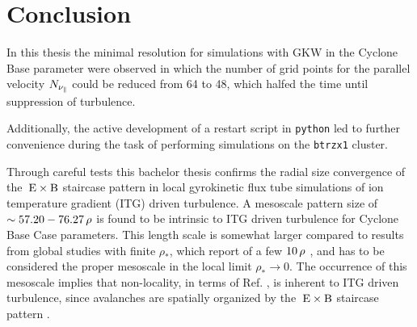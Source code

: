 
\chapter{Conclusion}
\label{chap:close}

\thispagestyle{empty}
\newpage

In this thesis the minimal resolution for simulations with GKW in the Cyclone Base parameter were observed in which the number of grid points for the parallel velocity $N_{\nu_\parallel}$ could be reduced from 64 to 48, which halfed the time until suppression of turbulence. \bigskip

Additionally, the active development of a restart script in \texttt{python} led to further convenience during the task of performing simulations on the \texttt{btrzx1} cluster. \bigskip

Through careful tests this bachelor thesis confirms the radial size convergence of the $\mathrm{\:E}\times\mathrm{B}$ staircase pattern in local gyrokinetic flux tube simulations of ion temperature gradient (ITG) driven turbulence.
A mesoscale pattern size of $\sim 57.20 - 76.27\,\rho$ is found to be intrinsic to ITG driven turbulence for Cyclone Base Case parameters.
This length scale is somewhat larger compared to results from global studies with finite $\rho_\ast$, which report of a few $10\,\rho$ \cite{Pradalier2010}, and has to be considered the proper mesoscale in the local limit $\rho_\ast \rightarrow 0$.  
The occurrence of this mesoscale implies that non-locality, in terms of Ref. , is inherent to ITG driven turbulence, since avalanches are spatially organized by the $\mathrm{\:E}\times\mathrm{B}$ staircase pattern \cite{McMillan2009, Pradalier2010, Rath2016, Peeters2016}. 